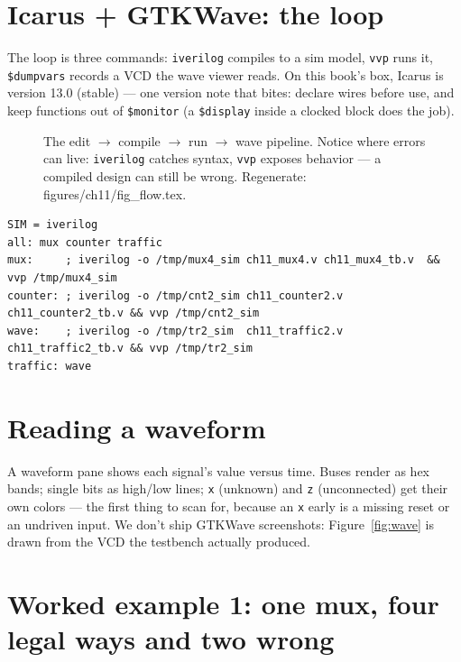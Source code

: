 \section{Icarus + GTKWave: the loop}\label{sec:icarus}

 The loop is three commands: \texttt{iverilog}
compiles to a sim model, \texttt{vvp} runs it, \texttt{\$dumpvars}
records a VCD the wave viewer reads. On this book's box, Icarus is
version 13.0 (stable) --- one version note that bites: declare wires
before use, and keep functions out of \texttt{\$monitor} (a
\texttt{\$display} inside a clocked block does the job).

\begin{figure}[htbp]
\centering

\caption{The edit $\to$ compile $\to$ run $\to$ wave pipeline. Notice
where errors can live: \texttt{iverilog} catches syntax, \texttt{vvp}
exposes behavior --- a compiled design can still be wrong.
Regenerate: \ttfamily figures/ch11/fig\_flow.tex.}
\label{fig:flow11}
\end{figure}

\begin{lstlisting}[caption={\ttfamily code/ch11\_Makefile --- the sim
targets used throughout this book.},label={lst:mk}]
SIM = iverilog
all: mux counter traffic
mux:     ; iverilog -o /tmp/mux4_sim ch11_mux4.v ch11_mux4_tb.v  && vvp /tmp/mux4_sim
counter: ; iverilog -o /tmp/cnt2_sim ch11_counter2.v ch11_counter2_tb.v && vvp /tmp/cnt2_sim
wave:    ; iverilog -o /tmp/tr2_sim  ch11_traffic2.v ch11_traffic2_tb.v && vvp /tmp/tr2_sim
traffic: wave
\end{lstlisting}

\section{Reading a waveform}\label{sec:wave}

A waveform pane shows each signal's value versus time. Buses render as
hex bands; single bits as high/low lines; \texttt{x} (unknown) and
\texttt{z} (unconnected) get their own colors --- the first thing to
scan for, because an \texttt{x} early is a missing reset or an
undriven input. We don't ship GTKWave screenshots: Figure~\ref{fig:wave}
is drawn from the VCD the testbench actually produced.

\section{Worked example 1: one mux, four legal ways and two wrong}
\label{sec:we-mux4}

